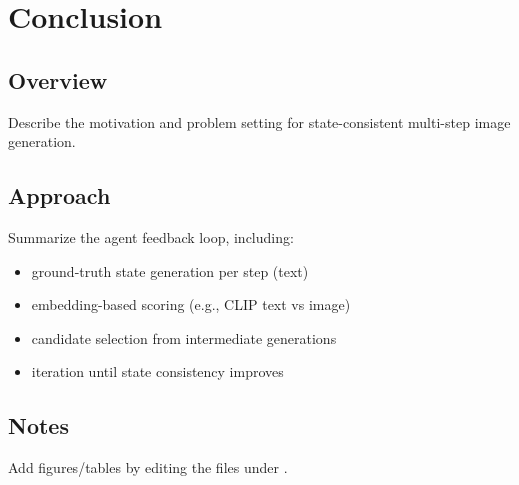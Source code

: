 \chapter{Conclusion}


\section{Overview}
Describe the motivation and problem setting for state-consistent multi-step image generation.

\section{Approach}
Summarize the agent feedback loop, including:
\begin{itemize}
  \item ground-truth state generation per step (text)
  \item embedding-based scoring (e.g., CLIP text vs image)
  \item candidate selection from intermediate generations
  \item iteration until state consistency improves
\end{itemize}

\section{Notes}
Add figures/tables by editing the files under \texttt{}.
